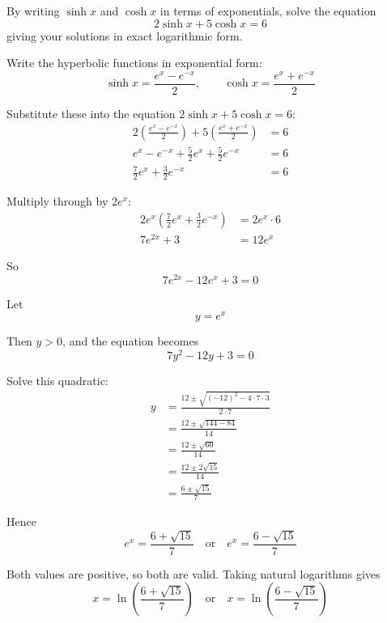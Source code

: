 \documentclass[leqno]{article}
\begin{document}
\djsFrontMatter
\begin{enumerate}[
  label=\textbf{\arabic*.},
  leftmargin=*,
  topsep=0pt,
  partopsep=0pt,
  parsep=0pt
]

\questionitem

By writing $\sinh x$ and $\cosh x$ in terms of exponentials, solve the equation \[2\sinh x+5\cosh x=6\] giving your solutions in exact logarithmic form. 

\vspace*{10pt}

\begin{djsSolution}
Write the hyperbolic functions in exponential form:
\[
\sinh x=\frac{e^x-e^{-x}}{2},
\qquad
\cosh x=\frac{e^x+e^{-x}}{2}
\]

Substitute these into the equation \(2\sinh x+5\cosh x=6\):
\begin{align*}
2\left(\frac{e^x-e^{-x}}{2}\right)+5\left(\frac{e^x+e^{-x}}{2}\right)&=6\\
e^x-e^{-x}+\frac{5}{2}e^x+\frac{5}{2}e^{-x}&=6\\
\frac{7}{2}e^x+\frac{3}{2}e^{-x}&=6
\end{align*}

Multiply through by \(2e^x\):
\begin{align*}
2e^x\left(\frac{7}{2}e^x+\frac{3}{2}e^{-x}\right)&=2e^x\cdot 6\\
7e^{2x}+3&=12e^x
\end{align*}

So
\[
7e^{2x}-12e^x+3=0
\]

Let
\[
y=e^x
\]

Then \(y>0\), and the equation becomes
\[
7y^2-12y+3=0
\]

Solve this quadratic:
\begin{align*}
y&=\frac{12\pm\sqrt{(-12)^2-4\cdot 7\cdot 3}}{2\cdot 7}\\
&=\frac{12\pm\sqrt{144-84}}{14}\\
&=\frac{12\pm\sqrt{60}}{14}\\
&=\frac{12\pm 2\sqrt{15}}{14}\\
&=\frac{6\pm\sqrt{15}}{7}
\end{align*}

Hence
\[
e^x=\frac{6+\sqrt{15}}{7}
\quad \text{or} \quad
e^x=\frac{6-\sqrt{15}}{7}
\]

Both values are positive, so both are valid. Taking natural logarithms gives
\[
x=\ln\left(\frac{6+\sqrt{15}}{7}\right)
\quad \text{or} \quad
x=\ln\left(\frac{6-\sqrt{15}}{7}\right)
\]


\end{djsSolution}
\end{enumerate}
\end{document}
